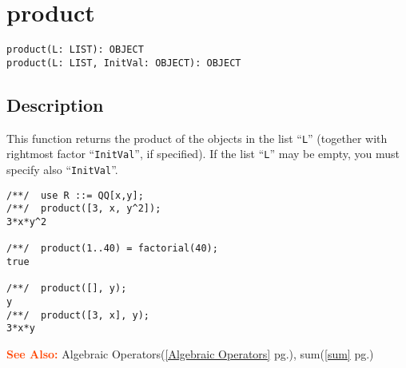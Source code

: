 \documentclass[a4paper]{mybook}
\newenvironment{command}{}{} %
\newcommand\SeeAlso{\par\textcolor{OrangeRed}{\textbf{\large See Also: }}}
\begin{document}
\section{product}
\label{product}
\begin{command} %


\begin{Verbatim}[label=syntax, rulecolor=\color{MidnightBlue},
frame=single]
product(L: LIST): OBJECT
product(L: LIST, InitVal: OBJECT): OBJECT
\end{Verbatim}


\subsection*{Description}

This function returns the product of the objects in the list ``\verb&L&'' (together
with rightmost factor ``\verb&InitVal&'', if specified).  If the list ``\verb&L&'' may be
empty, you must specify also ``\verb&InitVal&''.
\begin{Verbatim}[label=example, rulecolor=\color{PineGreen}, frame=single]
/**/  use R ::= QQ[x,y];
/**/  product([3, x, y^2]);
3*x*y^2

/**/  product(1..40) = factorial(40);
true

/**/  product([], y);
y
/**/  product([3, x], y);
3*x*y
\end{Verbatim}


\SeeAlso %
  Algebraic Operators(\ref{Algebraic Operators} pg.\pageref{Algebraic Operators}), 
    sum(\ref{sum} pg.\pageref{sum})
\end{command} %
\end{document}
